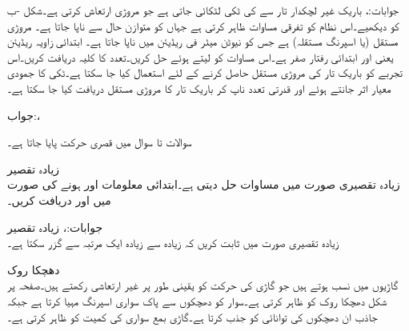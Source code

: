 جوابات:، 
باریک غیر لچکدار تار سے    کی ٹکی لٹکائی جاتی ہے جو مروڑی ارتعاش کرتی ہے۔شکل -ب کو دیکھیے۔اس نظام کو  تفرقی مساوات ظاہر کرتی ہے جہاں  کو  متوازن حال سے ناپا جاتا ہے۔  مروڑی مستقل (یا اسپرنگ مستقلہ) ہے جس کو  نیوٹن میٹر فی ریڈیئن میں ناپا جاتا ہے۔ ابتدائی زاویہ  ریڈیئن یعنی  اور ابتدائی رفتار صفر ہے۔اس مساوات کو  لیتے ہوئے  حل کریں۔تعدد کا کلیہ دریافت کریں۔اس تجربے کو باریک تار کی مروڑی مستقل  حاصل کرنے کے لئے استعمال کیا جا سکتا  ہے۔ٹکی کا جمودی معیار اثر جانتے ہوئے اور قدرتی تعدد ناپ کر باریک تار کا مروڑی مستقل  دریافت کیا جا سکتا ہے۔ 

جواب:، 

سوالات  تا سوال  میں قصری حرکت پایا جاتا ہے۔

\quad زیادہ تقصیر\\
زیادہ تقصیری صورت میں مساوات  حل دیتی ہے۔ابتدائی معلومات  اور  ہونے کی صورت میں  اور  دریافت کریں۔

جوابات:،
\quad زیادہ تقصیر\\
زیادہ تقصیری صورت میں ثابت کریں کہ  زیادہ سے زیادہ ایک مرتبہ  سے گزر سکتا ہے۔

\quad دھچکا روک\\
گاڑیوں میں  نسب ہوتے ہیں جو گاڑی کی حرکت کو یقینی طور پر غیر ارتعاشی رکھتے ہیں۔صفحہ  پر شکل  دھچکا روک کو ظاہر کرتی ہے۔سوار کو دھچکوں سے پاک سواری اسپرنگ مہیا کرتا ہے جبکہ جاذب ان دھچکوں کی توانائی کو جذب کرتا ہے۔گاڑی بمع سواری کی کمیت کو  ظاہر کرتی ہے۔

